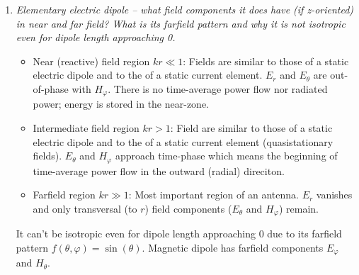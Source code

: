 \documentclass[11pt,a4paper]{article}
\begin{document}
\begin{enumerate}
    \item \emph{Elementary electric dipole -- what field components it does have (if z-oriented) in near and far field? What is its farfield pattern and why it is not isotropic even for dipole length approaching 0.}
    \begin{itemize}
        \item Near (reactive) field region $kr \ll 1$: Fields are similar to those of a static electric dipole and to the of a static current element. $E_r$ and $E_\theta$ are out-of-phase with $H_\varphi$. There is no time-average power flow nor radiated power; energy is stored in the near-zone.
        
        \item Intermediate field region $kr > 1$: Field are similar to those of a static electric dipole and to the of a static current element (quasistationary fields). $E_\theta$ and $H_\varphi$ approach time-phase which means the beginning of time-average power flow in the outward (radial) direciton.
        
        \item Farfield region $kr \gg 1$: Most important region of an antenna. $E_r$ vanishes and only transversal (to $r$) field components ($E_\theta$ and $H_\varphi$) remain.
    \end{itemize}
    It can't be isotropic even for dipole length approaching 0 due to its farfield pattern $f(\theta,\varphi) = \sin(\theta)$. Magnetic dipole has farfield components $E_\varphi$ and $H_\theta$.


\end{enumerate}
\end{document}

